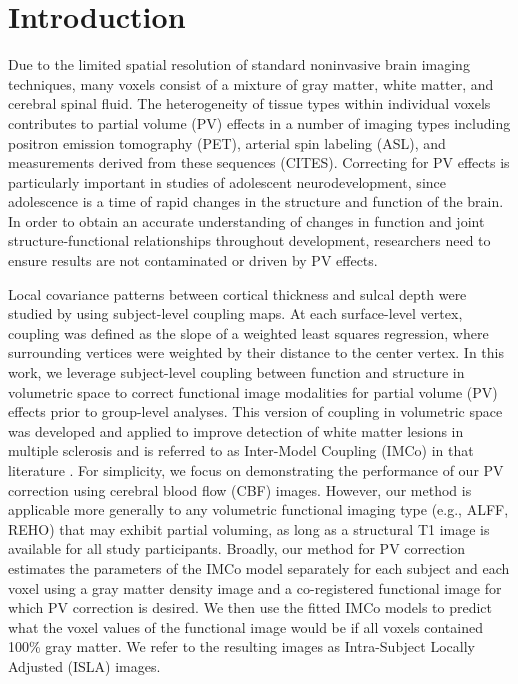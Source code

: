\documentclass[review]{elsarticle}
\begin{document}
\linenumbers

\section{Introduction}
\label{sec:Intro}
Due to the limited spatial resolution of standard noninvasive brain imaging techniques, many voxels consist of a mixture of gray matter, white matter, and cerebral spinal fluid. The heterogeneity of tissue types within individual voxels contributes to partial volume (PV) effects in a number of imaging types including positron emission tomography (PET), arterial spin labeling (ASL), and measurements derived from these sequences (CITES). Correcting for PV effects is particularly important in studies of adolescent neurodevelopment, since adolescence is a time of rapid changes in the structure and function of the brain. In order to obtain an accurate understanding of changes in function and joint structure-functional relationships throughout development, researchers need to ensure results are not contaminated or driven by PV effects.   

Local covariance patterns between cortical thickness and sulcal depth were studied by \citep{Van+etal:16} using subject-level coupling maps. At each surface-level vertex, coupling was defined as the slope of a weighted least squares regression, where surrounding vertices were weighted by their distance to the center vertex. In this work, we leverage subject-level coupling between function and structure in volumetric space to correct functional image modalities for partial volume (PV) effects prior to group-level analyses. This version of coupling in volumetric space was developed and applied to improve detection of white matter lesions in multiple sclerosis and is referred to as Inter-Model Coupling (IMCo) in that literature \citep{valcarcel2018mimosa,valcarcel2018dual}. For simplicity, we focus on demonstrating the performance of our PV correction using cerebral blood flow (CBF) images. However, our method is applicable more generally to any volumetric functional imaging type (e.g., ALFF, REHO) that may exhibit partial voluming, as long as a structural T1 image is available for all study participants. Broadly, our method for PV correction estimates the parameters of the IMCo model separately for each subject and each voxel using a gray matter density image and a co-registered functional image for which PV correction is desired. We then use the fitted IMCo models to predict what the voxel values of the functional image would be if all voxels contained 100\% gray matter. We refer to the resulting images as Intra-Subject Locally Adjusted (ISLA) images.
\end{document}
